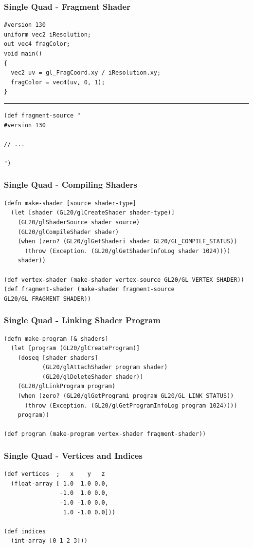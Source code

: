 \documentclass[aspectratio=169,11pt,xcolor=dvipsnames]{beamer}
\begin{document}
\begin{frame}[fragile]
  \frametitle{Single Quad {-} Fragment Shader}
  \begin{verbatim}
#version 130
uniform vec2 iResolution;
out vec4 fragColor;
void main()
{
  vec2 uv = gl_FragCoord.xy / iResolution.xy;
  fragColor = vec4(uv, 0, 1);
}
  \end{verbatim}
  \rule{\textwidth}{1pt}
  \begin{verbatim}
(def fragment-source "
#version 130

// ...

")
  \end{verbatim}
\end{frame}

\begin{frame}[fragile]
  \frametitle{Single Quad {-} Compiling Shaders}
  \begin{verbatim}
(defn make-shader [source shader-type]
  (let [shader (GL20/glCreateShader shader-type)]
    (GL20/glShaderSource shader source)
    (GL20/glCompileShader shader)
    (when (zero? (GL20/glGetShaderi shader GL20/GL_COMPILE_STATUS))
      (throw (Exception. (GL20/glGetShaderInfoLog shader 1024))))
    shader))

(def vertex-shader (make-shader vertex-source GL20/GL_VERTEX_SHADER))
(def fragment-shader (make-shader fragment-source GL20/GL_FRAGMENT_SHADER))
  \end{verbatim}
\end{frame}

\begin{frame}[fragile]
  \frametitle{Single Quad {-} Linking Shader Program}
  \begin{verbatim}
(defn make-program [& shaders]
  (let [program (GL20/glCreateProgram)]
    (doseq [shader shaders]
           (GL20/glAttachShader program shader)
           (GL20/glDeleteShader shader))
    (GL20/glLinkProgram program)
    (when (zero? (GL20/glGetProgrami program GL20/GL_LINK_STATUS))
      (throw (Exception. (GL20/glGetProgramInfoLog program 1024))))
    program))

(def program (make-program vertex-shader fragment-shader))
  \end{verbatim}
\end{frame}

\begin{frame}[fragile]
  \frametitle{Single Quad {-} Vertices and Indices}
  \begin{verbatim}
(def vertices  ;   x    y   z
  (float-array [ 1.0  1.0 0.0,
                -1.0  1.0 0.0,
                -1.0 -1.0 0.0,
                 1.0 -1.0 0.0]))

(def indices
  (int-array [0 1 2 3]))
  \end{verbatim}
\end{frame}
\end{document}
